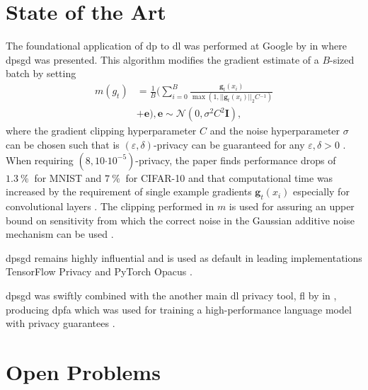 \documentclass[12pt,fleqn,twocolumn]{article}
\newcommand{\pro}{\ensuremath{\:\%{}\:}}
\newcommand{\ctp}[1]{\ensuremath{\cdot10^{#1}}}
\newcommand{\reci}{\ensuremath{^{-1}}}
\begin{document}
\section*{State of the Art}%
\label{sec:State of The Art}
The foundational application of \acrshort{dp} to \acrshort{dl} was performed at Google by \textcite{abadi2016dldp} in \citeyear{abadi2016dldp} where \acrfull{dpsgd} was presented.
This algorithm modifies the gradient estimate of a $B$-sized batch by setting
\begin{align*}
    m(g_t) &= \frac 1 B \Big(
        \sum_{i=0}^B \frac{\mathbf g_t(x_i)}{\operatorname{max}\left(1, || \mathbf g_t(x_i)||_2 C\reci\right)}
    \\ &+ \mathbf e \Big), \mathbf e\sim \mathcal N(0, \sigma^2C^2 \mathbf I),
\end{align*}
where the gradient clipping hyperparameter $C$ and the noise hyperparameter $\sigma$ can be chosen such that is $(\varepsilon, \delta)$-privacy can be guaranteed for any $\varepsilon, \delta > 0$ \cite[Ch. 3.1]{abadi2016dldp}.
When requiring $(8, 10\ctp{-5})$-privacy, the paper finds performance drops of $1.3\pro$ for MNIST and $7\pro$ for CIFAR-10 \cite[Chap. 5.3]{abadi2016dldp} and that computational time was increased by the requirement of single example gradients $\mathbf g_t(x_i)$ especially for convolutional layers \cite[Chap. 4]{abadi2016dldp}.
The clipping performed in $m$ is used for assuring an upper bound on sensitivity from which the correct noise in the Gaussian additive noise mechanism can be used \cite[Chap. 4]{abadi2016dldp}.

\acrshort{dpsgd} remains highly influential and is used as default in leading implementations TensorFlow Privacy \cite{rade2019tensorflow} and PyTorch Opacus \cite{yousef2021opacus}.

\acrshort{dpsgd} was swiftly combined with the another main \acrshort{dl} privacy tool, \acrfull{fl} by \textcite{mcmahan2017learningdp} in \citeyear{mcmahan2017learningdp}, producing \acrfull{dpfa} which was used for training a high-performance language model with privacy guarantees \cite[Chap. 3]{mcmahan2017learningdp}.



\section*{Open Problems}%
\label{sec:Open Problems}

\clearpage
\renewcommand*{\bibfont}{\normalfont\footnotesize}
\printbibliography[heading=bibintoc]

\printglossary[type=\acronymtype]
\end{document}
